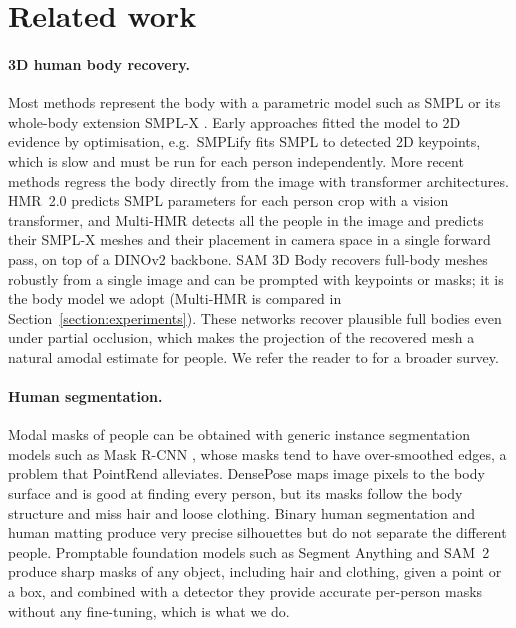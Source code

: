 \documentclass[pdflatex,sn-mathphys-num]{sn-jnl}%
\begin{document}
\section{Related work}
\label{section:relatedwork}
\paragraph{3D human body recovery.} Most methods represent the body with a parametric model such as SMPL \citep{loper2015smpl} or its whole-body extension SMPL-X \citep{SMPL-X:2019}. Early approaches fitted the model to 2D evidence by optimisation, e.g.\ SMPLify \citep{bogo2016keep} fits SMPL to detected 2D keypoints, which is slow and must be run for each person independently. More recent methods regress the body directly from the image with transformer architectures. HMR~2.0 \citep{goel2023humans} predicts SMPL parameters for each person crop with a vision transformer, and Multi-HMR \citep{baradel2024multihmr} detects all the people in the image and predicts their SMPL-X meshes and their placement in camera space in a single forward pass, on top of a DINOv2 \citep{oquab2024dinov2} backbone. SAM 3D Body \citep{yang2026sam3dbody} recovers full-body meshes robustly from a single image and can be prompted with keypoints or masks; it is the body model we adopt (Multi-HMR is compared in Section~\ref{section:experiments}). These networks recover plausible full bodies even under partial occlusion, which makes the projection of the recovered mesh a natural amodal estimate for people. We refer the reader to \citet{MUHAMMAD2022103628} for a broader survey.

\paragraph{Human segmentation.} Modal masks of people can be obtained with generic instance segmentation models such as Mask R-CNN \citep{MaskRCNN}, whose masks tend to have over-smoothed edges, a problem that PointRend \citep{kirillov2019pointrend} alleviates. DensePose \citep{Guler2018DensePose} maps image pixels to the body surface and is good at finding every person, but its masks follow the body structure and miss hair and loose clothing. Binary human segmentation \citep{people_segmentation} and human matting \citep{ke2022modnet} produce very precise silhouettes but do not separate the different people. Promptable foundation models such as Segment Anything \citep{kirillov2023sam} and SAM~2 \citep{ravi2024sam2} produce sharp masks of any object, including hair and clothing, given a point or a box, and combined with a detector they provide accurate per-person masks without any fine-tuning, which is what we do.
\end{document}
